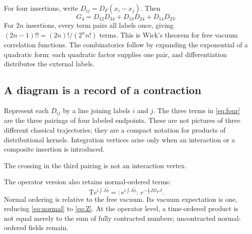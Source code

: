 \documentclass[11pt]{article}
\newcommand{\ii}{\mathrm i}
\newcommand{\Tord}{\mathrm T}
\begin{document}
For four insertions, write \(D_{ij}=D_F(x_i-x_j)\). Then
\begin{equation}
 G_4=D_{12}D_{34}+D_{13}D_{24}+D_{14}D_{23}.          \label{eq:four}
\end{equation}
For \(2n\) insertions, every term pairs all labels once, giving
\((2n-1)!!=(2n)!/(2^n n!)\) terms. This is Wick's theorem for free
vacuum correlation functions. The combinatorics follow by expanding
the exponential of a quadratic form: each quadratic factor supplies
one pair, and differentiation distributes the external labels.

\subsection{A diagram is a record of a contraction}
Represent each \(D_{ij}\) by a line joining labels \(i\) and \(j\).
The three terms in \eqref{eq:four} are the three pairings of four
labeled endpoints. These are not pictures of three different
classical trajectories; they are a compact notation for products of
distributional kernels. Integration vertices arise only when an
interaction or a composite insertion is introduced.

\begin{center}
\end{center}
The crossing in the third pairing is not an interaction vertex.

The operator version also retains normal-ordered terms:
\begin{equation}
 \Tord e^{\ii\int J\hat\phi}
 =:\!e^{\ii\int J\hat\phi}\!:\,
   e^{-\frac12JD_FJ}.                               \label{eq:normal}
\end{equation}
Normal ordering is relative to the free vacuum. Its vacuum expectation
is one, reducing \eqref{eq:normal} to \eqref{eq:Z}. At the operator
level, a time-ordered product is not equal merely to the sum of
fully contracted numbers; uncontracted normal-ordered fields remain.
\end{document}
